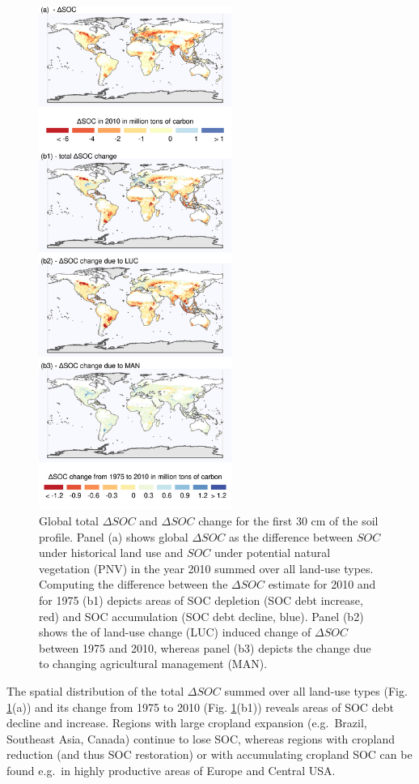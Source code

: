 \documentclass[gc, manuscript]{copernicus}
\begin{document}
\begin{figure}[h]
\includegraphics[width=6.3cm]{../ResultNotebooks/Output/Images/SpatialDebtFigure} \caption{Global total $\Delta SOC$ and $\Delta SOC$ change for the first 30 cm of the soil profile. Panel (a) shows global $\Delta SOC$ as the difference between $SOC$ under historical land use and $SOC$ under potential natural vegetation (PNV) in the year 2010 summed over all land-use types. Computing the difference between the $\Delta SOC$ estimate for 2010 and for 1975 (b1) depicts areas of SOC depletion (SOC debt increase, red) and SOC accumulation (SOC debt decline, blue). Panel (b2) shows the of land-use change (LUC) induced change of $\Delta SOC$ between 1975 and 2010, whereas panel (b3) depicts the change due to changing agricultural management (MAN).}\label{fig:SOCdebt}
\end{figure}

The spatial distribution of the total \(\Delta SOC\) summed over all land-use types (Fig. \ref{fig:SOCdebt}(a)) and its change from 1975 to 2010 (Fig. \ref{fig:SOCdebt}(b1)) reveals areas of SOC debt decline and increase.
Regions with large cropland expansion (e.g.~Brazil, Southeast Asia, Canada) continue to lose SOC, whereas regions with cropland reduction (and thus SOC restoration) or with accumulating cropland SOC can be found e.g.~in highly productive areas of Europe and Central USA.
\end{document}
